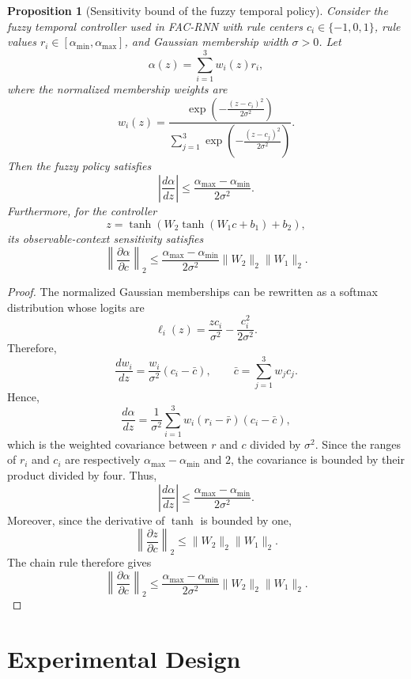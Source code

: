 \documentclass[journal]{IEEEtran}
\newtheorem{proposition}{Proposition}
\begin{document}
	
\begin{proposition}[Sensitivity bound of the fuzzy temporal policy]
	Consider the fuzzy temporal controller used in FAC-RNN with rule
	centers $c_i\in\{-1,0,1\}$, rule values
	$r_i\in[\alpha_{\min},\alpha_{\max}]$, and Gaussian membership width
	$\sigma>0$. Let
	\[
	\alpha(z)=\sum_{i=1}^{3} w_i(z)r_i,
	\]
	where the normalized membership weights are
	\[
	w_i(z)=
	\frac{
		\exp\left(-\frac{(z-c_i)^2}{2\sigma^2}\right)
	}{
		\sum_{j=1}^{3}
		\exp\left(-\frac{(z-c_j)^2}{2\sigma^2}\right)
	}.
	\]
	Then the fuzzy policy satisfies
	\[
	\left|\frac{d\alpha}{dz}\right|
	\leq
	\frac{\alpha_{\max}-\alpha_{\min}}{2\sigma^2}.
	\]
	Furthermore, for the controller
	\[
	z=\tanh\left(
	W_2\tanh(W_1c+b_1)+b_2
	\right),
	\]
	its observable-context sensitivity satisfies
	\[
	\left\|
	\frac{\partial\alpha}{\partial c}
	\right\|_2
	\leq
	\frac{\alpha_{\max}-\alpha_{\min}}
	{2\sigma^2}
	\|W_2\|_2\|W_1\|_2.
	\]
\end{proposition}

\begin{proof}
	The normalized Gaussian memberships can be rewritten as a softmax
	distribution whose logits are
	\[
	\ell_i(z)=\frac{zc_i}{\sigma^2}
	-\frac{c_i^2}{2\sigma^2}.
	\]
	Therefore,
	\[
	\frac{dw_i}{dz}
	=
	\frac{w_i}{\sigma^2}
	(c_i-\bar c),
	\qquad
	\bar c=\sum_{j=1}^{3}w_jc_j.
	\]
	Hence,
	\[
	\frac{d\alpha}{dz}
	=
	\frac{1}{\sigma^2}
	\sum_{i=1}^{3}
	w_i(r_i-\bar r)(c_i-\bar c),
	\]
	which is the weighted covariance between $r$ and $c$ divided by
	$\sigma^2$. Since the ranges of $r_i$ and $c_i$ are respectively
	$\alpha_{\max}-\alpha_{\min}$ and $2$, the covariance is bounded by
	their product divided by four. Thus,
	\[
	\left|\frac{d\alpha}{dz}\right|
	\leq
	\frac{\alpha_{\max}-\alpha_{\min}}
	{2\sigma^2}.
	\]
	Moreover, since the derivative of $\tanh$ is bounded by one,
	\[
	\left\|
	\frac{\partial z}{\partial c}
	\right\|_2
	\leq
	\|W_2\|_2\|W_1\|_2.
	\]
	The chain rule therefore gives
	\[
	\left\|
	\frac{\partial\alpha}{\partial c}
	\right\|_2
	\leq
	\frac{\alpha_{\max}-\alpha_{\min}}
	{2\sigma^2}
	\|W_2\|_2\|W_1\|_2.
	\]
\end{proof}



\section{Experimental Design}
\label{sec:experiments}
\end{document}
